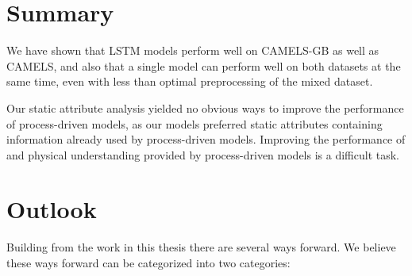 \section{Summary}
We have shown that LSTM models perform well on CAMELS-GB as well as CAMELS, and 
also that a single model can perform well on both datasets at the same time, even 
with less than optimal preprocessing of the mixed dataset.

Our static attribute analysis yielded no obvious ways to improve the performance 
of process-driven models, as our models preferred static attributes containing 
information already used by process-driven models. Improving the performance of and 
physical understanding provided by process-driven models is a difficult task.
\section{Outlook}
Building from the work in this thesis there are several ways forward. We believe 
these ways forward can be categorized into two categories:
